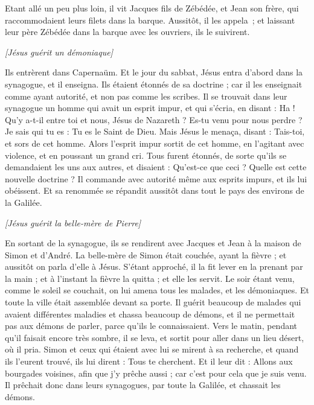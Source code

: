 \begin{multicols}{2}
Etant allé un peu plus loin, il vit Jacques fils de Zébédée, et Jean son frère, qui raccommodaient leurs filets dans la barque.
Aussitôt, il les appela ; et laissant leur père Zébédée dans la barque avec les ouvriers, ils le suivirent.
\begin{center}
\textit{[Jésus guérit un démoniaque]}
\end{center}
\PPE{}
Ils entrèrent dans Capernaüm. Et le jour du sabbat, Jésus entra d’abord dans la synagogue, et il enseigna.
Ils étaient étonnés de sa doctrine ; car il les enseignait comme ayant autorité, et non pas comme les scribes.
Il se trouvait dans leur synagogue un homme qui avait un esprit impur, et qui s'écria,
en disant : Ha ! Qu’y a-t-il entre toi et nous, Jésus de Nazareth ? Es-tu venu pour nous perdre ? Je sais qui tu es : Tu es le Saint de Dieu.
Mais Jésus le menaça, disant : Tais-toi, et sors de cet homme.
Alors l'esprit impur sortit de cet homme, en l’agitant avec violence, et en poussant un grand cri.
Tous furent étonnés, de sorte qu'ils se demandaient les uns aux autres, et disaient : Qu'est-ce que ceci ? Quelle est cette nouvelle doctrine ? Il commande avec autorité même aux esprits impurs, et ils lui obéissent.
Et sa renommée se répandit aussitôt dans tout le pays des environs de la Galilée.
\begin{center}
\textit{[Jésus guérit la belle-mère de Pierre]}
\end{center}
\PPE{}
En sortant de la synagogue, ils se rendirent avec Jacques et Jean à la maison de Simon et d'André.
La belle-mère de Simon était couchée, ayant la fièvre ; et aussitôt on parla d’elle à Jésus.
S’étant approché, il la fit lever en la prenant par la main ; et à l'instant la fièvre la quitta ; et elle les servit.
Le soir étant venu, comme le soleil se couchait, on lui amena tous les malades, et les démoniaques.
Et toute la ville était assemblée devant sa porte.
Il guérit beaucoup de malades qui avaient différentes maladies et chassa beaucoup de démons, et il ne permettait pas aux démons de parler, parce qu’ils le connaissaient.
Vers le matin, pendant qu’il faisait encore très sombre, il se leva, et sortit pour aller dans un lieu désert, où il pria.
Simon et ceux qui étaient avec lui se mirent à sa recherche,
et quand ils l’eurent trouvé, ils lui dirent : Tous te cherchent.
Et il leur dit : Allons aux bourgades voisines, afin que j'y prêche aussi ; car c’est pour cela que je suis venu.
Il prêchait donc dans leurs synagogues, par toute la Galilée, et chassait les démons.

\end{multicols}
